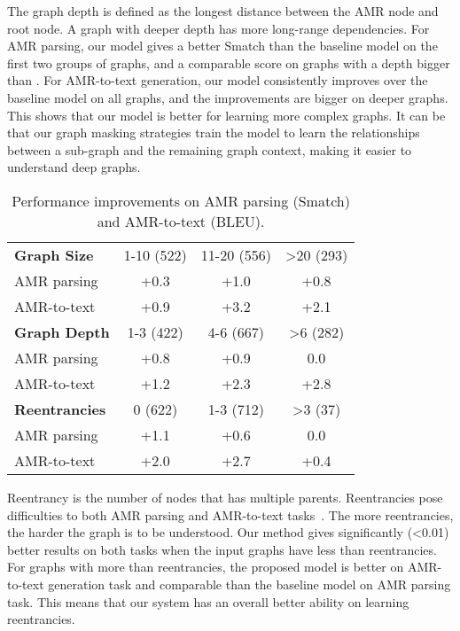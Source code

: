 \documentclass[11pt]{article}
\begin{document}
The graph depth is defined as the longest distance between the AMR node and root node. 
A graph with deeper depth has more long-range dependencies.
For AMR parsing, our model gives a better Smatch than the baseline model on the first two groups of graphs, and a comparable score on graphs with a depth bigger than .
For AMR-to-text generation, our model consistently improves over the baseline model on all graphs, and the improvements are bigger on deeper graphs.
This shows that our model is better for learning more complex graphs.
It can be that our graph masking strategies train the model to learn the relationships between a sub-graph and the remaining graph context, making it easier to understand deep graphs.

\begin{table}
	\centering
	\small
	\begin{tabular}{lccc}
		\toprule
		\textbf{Graph Size} &1-10 (522) &11-20 (556) &>20 (293) \\
		AMR parsing &+0.3 &+1.0 &+0.8 \\
		AMR-to-text &+0.9 &+3.2 &+2.1 \\
		\midrule
		\textbf{Graph Depth} &1-3 (422) &4-6 (667) &>6 (282) \\
		AMR parsing &+0.8 &+0.9 &0.0 \\
		AMR-to-text &+1.2 &+2.3 &+2.8 \\
		\midrule
		\textbf{Reentrancies} &0 (622) &1-3 (712) &>3 (37) \\
		AMR parsing &+1.1 &+0.6 &0.0 \\
		AMR-to-text &+2.0 &+2.7 &+0.4 \\
		\bottomrule
	\end{tabular}
	\caption{Performance improvements on AMR parsing (Smatch) and AMR-to-text (BLEU).}
	\label{tab:graph-analysis}
\end{table}

Reentrancy is the number of nodes that has multiple parents. 
Reentrancies pose difficulties to both AMR parsing and AMR-to-text tasks~\cite{damonte-cohen-2019-structural,szubert-etal-2020-role}.
The more reentrancies, the harder the graph is to be understood.
Our method gives significantly (<0.01) better results on both tasks when the input graphs have less than  reentrancies.
For graphs with more than  reentrancies, the proposed model is  better on AMR-to-text generation task and comparable than the baseline model on AMR parsing task.
This means that our system has an overall better ability on learning reentrancies.
\end{document}
